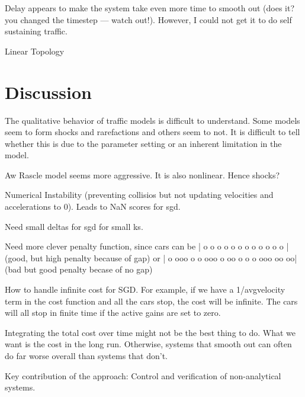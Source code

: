 \documentclass[10pt,twocolumn]{article}
\begin{document}
Delay appears to make the system take even more time to smooth out (does it? you changed the timestep --- watch out!). However, I could not get it to do self sustaining traffic.



Linear Topology


\section{Discussion}  

The qualitative behavior of traffic models is difficult to understand. Some models seem to form shocks and rarefactions and others seem to not. It is difficult to tell whether this is due to the parameter setting or an inherent limitation in the model.

Aw Rascle model seems more aggressive. It is also nonlinear. Hence shocks?

Numerical Instability (preventing collisios but not updating velocities and accelerations to 0). Leads to NaN scores for sgd.

Need small deltas for sgd for small ks.

Need more clever penalty function, since cars can be | o o o o o o o o o           o o o | (good, but high penalty because of gap) or | o ooo o o ooo o oo o o o ooo oo  oo| (bad but good penalty becase of no gap)

How to handle infinite cost for SGD. For example, if we have a 1/avgvelocity term in the cost function and all the cars stop, the cost will be infinite. The cars will all stop in finite time if the active gains are set to zero.

Integrating the total cost over time might not be the best thing to do. What we want is the cost in the long run. Otherwise, systems that smooth out can often do far worse overall than systems that don't.

Key contribution of the approach: Control and verification of non-analytical systems.
\end{document}

